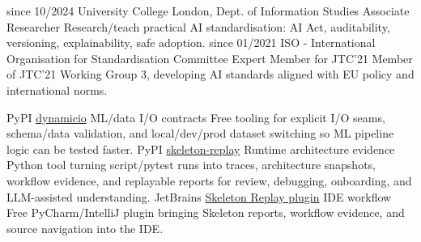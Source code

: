 \documentclass[]{../../../../friggeri-cv}
\begin{document}
\begin{entrylist2}
	\entrytwo
		{\footnotesize since 10/2024}
		{\small University College London, Dept. of Information Studies}
		{\small Associate Researcher}
		{\small Research/teach practical AI standardisation: AI Act, auditability, versioning, explainability, safe adoption.}
	\entrytwo
		{\footnotesize since 01/2021}
		{\small ISO - International Organisation for Standardisation}
		{\small Committee Expert Member for JTC'21}
		{\footnotesize Member of JTC'21 Working Group 3, developing AI standards aligned with EU policy and international norms.}
\end{entrylist2}
\begin{entrylist2}
	\entrytwo
		{\small PyPI}
		{\small \href{https://pypi.org/project/dynamicio/}{dynamicio}}
		{\small ML/data I/O contracts}
		{\footnotesize Free tooling for explicit I/O seams, schema/data validation, and local/dev/prod dataset switching so ML pipeline logic can be tested faster.}
	\entrytwo
		{\small PyPI}
		{\small \href{https://pypi.org/project/skeleton-replay/}{skeleton-replay}}
		{\small Runtime architecture evidence}
		{\footnotesize Python tool turning script/pytest runs into traces, architecture snapshots, workflow evidence, and replayable reports for review, debugging, onboarding, and LLM-assisted understanding.}
	\entrytwo
		{\small JetBrains}
		{\small \href{https://plugins.jetbrains.com/plugin/32807-skeleton-replay}{Skeleton Replay plugin}}
		{\small IDE workflow}
		{\footnotesize Free PyCharm/IntelliJ plugin bringing Skeleton reports, workflow evidence, and source navigation into the IDE.}
\end{entrylist2}
\end{document}
